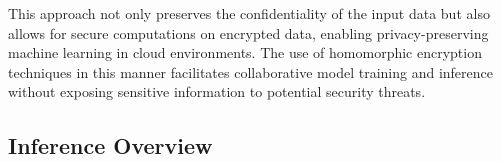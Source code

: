 \documentclass[conference]{IEEEtran}
\begin{document}
This approach not only preserves the confidentiality of the input data but also allows for secure computations on encrypted data, enabling privacy-preserving machine learning in cloud environments. The use of homomorphic encryption techniques in this manner facilitates collaborative model training and inference without exposing sensitive information to potential security threats.





\subsection{Inference Overview}
\end{document}
